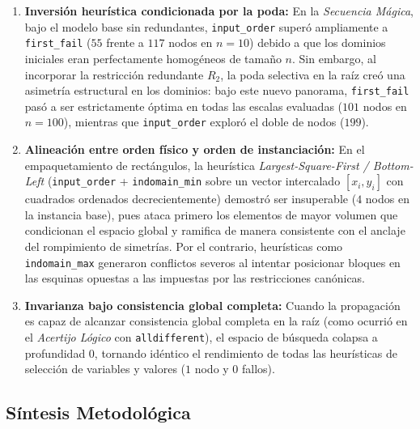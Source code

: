 \begin{enumerate}
    \item \textbf{Inversión heurística condicionada por la poda:}
    En la \textit{Secuencia Mágica}, bajo el modelo base sin redundantes, \texttt{input\_order} superó ampliamente a \texttt{first\_fail} ($55$ frente a $117$ nodos en $n=10$) debido a que los dominios iniciales eran perfectamente homogéneos de tamaño $n$. Sin embargo, al incorporar la restricción redundante $R_2$, la poda selectiva en la raíz creó una asimetría estructural en los dominios: bajo este nuevo panorama, \texttt{first\_fail} pasó a ser estrictamente óptima en todas las escalas evaluadas ($101$ nodos en $n=100$), mientras que \texttt{input\_order} exploró el doble de nodos ($199$).
    
    \item \textbf{Alineación entre orden físico y orden de instanciación:}
    En el empaquetamiento de rectángulos, la heurística \textit{Largest-Square-First / Bottom-Left} (\texttt{input\_order} + \texttt{indomain\_min} sobre un vector intercalado $[x_i, y_i]$ con cuadrados ordenados decrecientemente) demostró ser insuperable ($4$ nodos en la instancia base), pues ataca primero los elementos de mayor volumen que condicionan el espacio global y ramifica de manera consistente con el anclaje del rompimiento de simetrías. Por el contrario, heurísticas como \texttt{indomain\_max} generaron conflictos severos al intentar posicionar bloques en las esquinas opuestas a las impuestas por las restricciones canónicas.
    
    \item \textbf{Invarianza bajo consistencia global completa:}
    Cuando la propagación es capaz de alcanzar consistencia global completa en la raíz (como ocurrió en el \textit{Acertijo Lógico} con \texttt{alldifferent}), el espacio de búsqueda colapsa a profundidad $0$, tornando idéntico el rendimiento de todas las heurísticas de selección de variables y valores ($1$ nodo y $0$ fallos).
\end{enumerate}

\subsection{Síntesis Metodológica}

